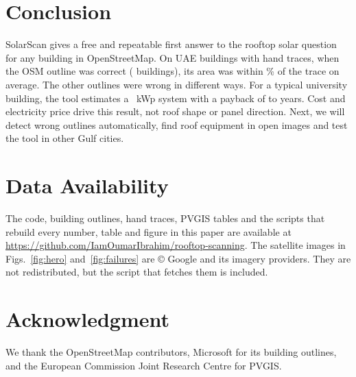 \documentclass[conference]{IEEEtran}
\begin{document}
\section{Conclusion}

SolarScan gives a free and repeatable first answer to the rooftop solar question for any building in OpenStreetMap. On \NManual{} UAE buildings with hand traces, when the OSM outline was correct (\NOsmOk{} buildings), its area was within \OkMape\% of the trace on average. The other \NOsmBad{} outlines were wrong in different ways. For a typical university building, the tool estimates a \CasePdc~kWp system with a payback of \PayMin{} to \PayMax{} years. Cost and electricity price drive this result, not roof shape or panel direction. Next, we will detect wrong outlines automatically, find roof equipment in open images and test the tool in other Gulf cities.

\section*{Data Availability}
The code, building outlines, hand traces, PVGIS tables and the scripts that rebuild every number, table and figure in this paper are available at \url{https://github.com/IamOumarIbrahim/rooftop-scanning}. The satellite images in Figs.~\ref{fig:hero} and~\ref{fig:failures} are \copyright{} Google and its imagery providers. They are not redistributed, but the script that fetches them is included.

\section*{Acknowledgment}
We thank the OpenStreetMap contributors, Microsoft for its building outlines, and the European Commission Joint Research Centre for PVGIS.

\balance


\end{document}
